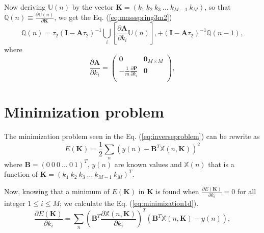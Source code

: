 \documentclass[review]{elsarticle}
\begin{document}
Now deriving $\mathbb{U}(n)$ by the vector $\mathbf{K}=( k_1~ k_2~ k_3~ \hdots ~ k_{M-1}~ k_M)$,
so that $\mathbb{Q}(n) \equiv \frac{\partial \mathbb{U}(n)}{\partial \mathbf{K}}$,
we get the Eq.  (\ref{eq:massspring3m2})
\begin{equation}\label{eq:massspring3m2}
 \mathbb{Q}(n) = 
  \tau_2 \left( \mathbf{I} -\mathbf{A}\tau_2 \right)^{-1} \bigcup_{i}{ \left[ \frac{ \partial \mathbf{A} }{\partial k_{i}}  \mathbb{U}(n)\right] },
 +\left( \mathbf{I} -\mathbf{A}\tau_2 \right)^{-1} \mathbb{Q}(n-1),
\end{equation}
where 
\begin{equation}\label{eq:dPdkim2}
 \frac{ \partial \mathbf{A} }{\partial k_{i}} = 
\left(
\begin{matrix}
 \mathbf{0}    & \mathbf{0}_{M \times M} \\
 -\frac{1}{m}\frac{ \partial\mathbf{P}}{\partial k_{i}} & \mathbf{0} \\
\end{matrix}\right)
,

\end{equation}
\section{Minimization problem}
The minimization problem seen in the Eq. (\ref{eq:inverseproblem}) can be rewrite as
\begin{equation}\label{eq:minimization1}
 E(\mathbf{K})=\frac{1}{2}\sum_{n} \left( y(n)-\mathbf{B}^{T}\mathbb{X}(n,\mathbf{K}) \right)^2
\end{equation}
where $\mathbf{B}=( 0~ 0~ 0~ \hdots ~ 0~ 1)^{T}$, $y(n)$ are known values and 
$\mathbb{X}(n)$ that is a function of $\mathbf{K}=( k_1~ k_2~ k_3~ \hdots ~ k_{M-1}~ k_M)^{T}$.

Now, knowing that a minimum of $E(\mathbf{K})$ in $\mathbf{K}$ is found when 
$\frac{\partial E(\mathbf{K})}{\partial k_i}=0$ for all integer $1 \leq i \leq M$; we calculate the
Eq. (\ref{eq:minimization1d}).
\begin{equation}\label{eq:minimization1d}
 \frac{\partial E(\mathbf{K})}{\partial k_i}=\sum_{n}{\left( \mathbf{B}^{T}\frac{\partial \mathbb{X}(n,\mathbf{K})}{\partial k_i}\right)^{T} \left( \mathbf{B}^{T}\mathbb{X}(n,\mathbf{K}) -y(n)  \right) },
\end{equation}
\end{document}
